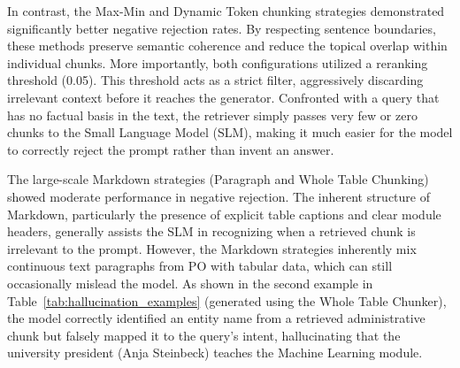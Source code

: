 \documentclass[12pt]{article} %
\begin{document}
In contrast, the Max-Min and Dynamic Token chunking strategies demonstrated significantly better negative rejection rates. By respecting sentence boundaries, these methods preserve semantic coherence and reduce the topical overlap within individual chunks. More importantly, both configurations utilized a reranking threshold (0.05). This threshold acts as a strict filter, aggressively discarding irrelevant context before it reaches the generator. Confronted with a query that has no factual basis in the text, the retriever simply passes very few or zero chunks to the Small Language Model (SLM), making it much easier for the model to correctly reject the prompt rather than invent an answer.

The large-scale Markdown strategies (Paragraph and Whole Table Chunking) showed moderate performance in negative rejection. The inherent structure of Markdown, particularly the presence of explicit table captions and clear module headers, generally assists the SLM in recognizing when a retrieved chunk is irrelevant to the prompt. However, the Markdown strategies inherently mix continuous text paragraphs from PO with tabular data, which can still occasionally mislead the model. As shown in the second example in Table~\ref{tab:hallucination_examples} (generated using the Whole Table Chunker), the model correctly identified an entity name from a retrieved administrative chunk but falsely mapped it to the query's intent, hallucinating that the university president (Anja Steinbeck) teaches the Machine Learning module.
\end{document}
